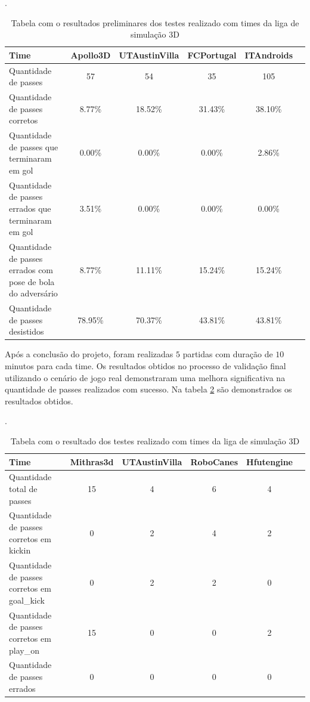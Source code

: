 \begin{table}[H]

\centering
\caption{Tabela com o resultados preliminares dos testes realizado com times da liga de simulação 3D}.

\begin{tabular}{|p{3cm}|c|c|c|c|c|}
    \hline
    Time & Apollo3D & UTAustinVilla & FCPortugal & ITAndroids \\ \hline
    Quantidade de passes	   				  & 57      & 54       & 35      & 105     \\ \hline
    Quantidade de passes corretos 				  & 8.77\%  & 18.52\%  & 31.43\% & 38.10\% \\ \hline
    Quantidade de passes que terminaram em gol 		  & 0.00\%  & 0.00\%   & 0.00\%  & 2.86\%  \\ \hline
    Quantidade de passes errados que terminaram em gol		  & 3.51\%  & 0.00\%   & 0.00\%  & 0.00\%  \\ \hline
    Quantidade de passes errados com pose de bola do adversário & 8.77\%  & 11.11\%  & 15.24\% & 15.24\% \\ \hline
    Quantidade de passes desistidos 				  & 78.95\% & 70.37\%  & 43.81\% & 43.81\% \\ \hline
  \end{tabular}

  \label{tab:resultado3}
\end{table}

Após a conclusão do projeto, foram realizadas $5$ partidas com duração de $10$ minutos para cada time. Os resultados obtidos 
no processo de validação final utilizando o cenário de jogo real demonstraram uma melhora significativa na quantidade de passes 
realizados com sucesso. Na tabela \ref{tab:resultado2} são demonstrados os resultados obtidos.  

\begin{table}[H]

\centering
\caption{Tabela com o resultado dos testes realizado com times da liga de simulação 3D}.

  \begin{tabular}{|p{3cm}|c|c|c|c|c|}
    \hline
    Time & Mithras3d & UTAustinVilla & RoboCanes & Hfutengine \\ \hline
    Quantidade total de passes				& 15	 & 4   & 6  &  4\\ \hline       
    Quantidade de passes corretos em kickin	  	& 0      & 2   & 4  &  2\\ \hline
    Quantidade de passes corretos em goal\_kick 	& 0      & 2   & 2  &  	0\\ \hline
    Quantidade de passes corretos em play\_on 	  	& 15     & 0   & 0  &  	2\\ \hline
    Quantidade de passes errados	  		& 0	 & 0   & 0  &  	0\\ \hline
    
  \end{tabular}

  \label{tab:resultado2}
\end{table}

